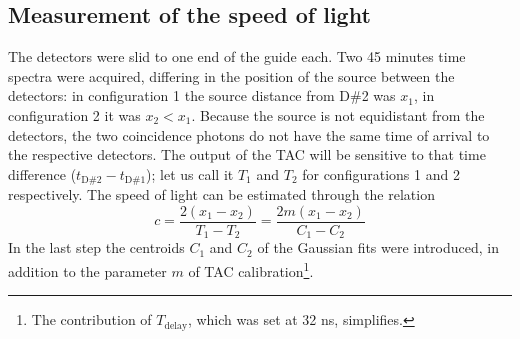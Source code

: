 \documentclass[a4paper]{article}
\begin{document}
\subsection{Measurement of the speed of light}
\hypertarget{2.4}{}
The detectors were slid to one end of the guide each. 
Two 45 minutes time spectra were acquired, differing in the position of the  source between the detectors: in configuration 1 the source distance from D\#2 was $x_1$, in configuration 2 it was $x_2<x_1$. 
Because the source is not equidistant from the detectors, the two coincidence photons do not have the same time of arrival to the respective detectors. 
The output of the TAC will be sensitive to that time difference ($t_{\mathrm{D\#2}}-t_{\mathrm{D\#1}}$); let us call it $T_1$ and $T_2$ for configurations 1 and 2 respectively. 
The speed of light can be estimated through the relation%
\begin{equation}\label{eq: speed of light}
    c=\frac{2(x_1-x_2)}{T_1-T_2}=\frac{2m(x_1-x_2)}{C_1-C_2}
\end{equation}
In the last step the centroids $C_1$ and $C_2$ of the Gaussian fits were introduced, in addition to the parameter $m$ of TAC calibration\footnote{The contribution of $T_{\mathrm{delay}}$, which was set at 32 ns, simplifies.}. 
\end{document}

